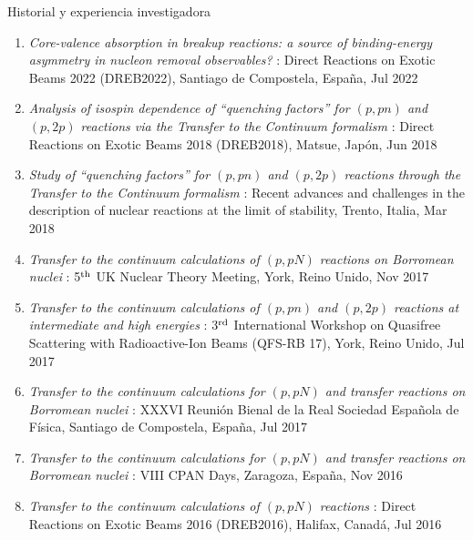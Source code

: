 \documentclass{resume2} %
\begin{document}
\begin{rSection}{Historial y experiencia investigadora}
\begin{enumerate}[label=\alph*.]
\begin{itemize}
\begin{enumerate}[label=\arabic*.]
\item {\it Core-valence absorption in breakup reactions: a source of
binding-energy asymmetry in nucleon removal observables?} 
: Direct Reactions on Exotic Beams 2022 (DREB2022), Santiago de Compostela, Espa\~na, Jul 2022

\item {\it Analysis of isospin dependence of “quenching factors” for $(p, pn)$ and $(p, 2p)$ reactions via the Transfer to the Continuum formalism} 
: Direct Reactions on Exotic Beams 2018 (DREB2018), Matsue, Jap\'on, Jun 2018

\item {\it Study of “quenching factors” for $(p, pn)$ and $(p, 2p)$ reactions
through the Transfer to the Continuum formalism} 
: Recent advances and challenges in the description of nuclear reactions at the limit of stability, Trento, Italia, Mar 2018

\item {\it Transfer to the continuum calculations of $(p, pN )$ reactions on Borromean nuclei} 
: 5$^{\rm th}$ UK Nuclear Theory Meeting, York, Reino Unido, Nov 2017

\item {\it Transfer to the continuum calculations of $(p, pn)$ and $(p, 2p)$ reactions at intermediate and high energies} 
: 3$^{\rm rd}$ International Workshop on Quasifree Scattering
with Radioactive-Ion Beams (QFS-RB 17), York, Reino Unido, Jul 2017

\item {\it Transfer to the continuum calculations for $(p, pN)$ and transfer reactions on Borromean nuclei} 
: XXXVI Reuni\'on Bienal de la Real Sociedad Española de F\'isica, Santiago de Compostela, Espa\~na, Jul 2017

\item {\it Transfer to the continuum calculations for $(p, pN )$ and transfer reactions on Borromean nuclei} 
: VIII CPAN Days, Zaragoza, Espa\~na, Nov 2016

\item {\it Transfer to the continuum calculations of $(p, pN )$ reactions} 
: Direct Reactions on Exotic Beams 2016 (DREB2016), Halifax, Canad\'a, Jul 2016
 



\end{enumerate}
\end{itemize}
\end{enumerate}
\end{rSection}
\end{document}
